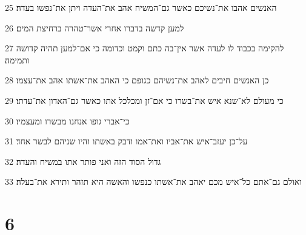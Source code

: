 \par 25 האנשים אהבו את־נשיכם כאשר גם־המשיח אהב את־העדה ויתן את־נפשו בעדה׃
\par 26 למען קדשה בדברו אחרי אשר־טהרה ברחיצת המים׃
\par 27 להקימה בכבוד לו לעדה אשר אין־בה כתם וקמט וכדומה כי אם־למען תהיה קדושה ותמימה׃
\par 28 כן האנשים חיבים לאהב את־נשיהם כגופם כי האהב את־אשתו אהב את־עצמו׃
\par 29 כי מעולם לא־שנא איש את־בשרו כי אם־זן ומכלכל אתו כאשר גם־האדון את־עדתו׃
\par 30 כי־אברי גופו אנחנו מבשרו ומעצמיו׃
\par 31 על־כן יעזב־איש את־אביו ואת־אמו ודבק באשתו והיו שניהם לבשר אחד׃
\par 32 גדול הסוד הזה ואני פותר אתו במשיח והעדה׃
\par 33 ואולם גם־אתם כל־איש מכם יאהב את־אשתו כנפשו והאשה היא תזהר ותירא את־בעלה׃

\chapter{6}

